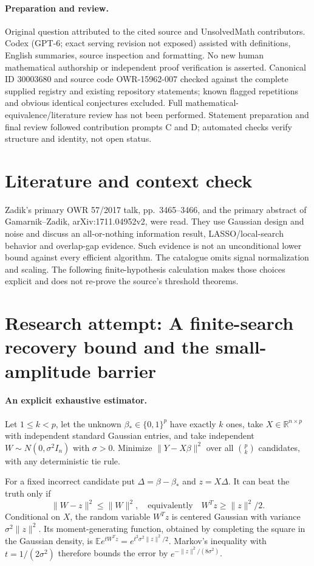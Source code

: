 \documentclass[11pt]{article}
\begin{document}
\paragraph{Preparation and review.}
Original question attributed to the cited source and UnsolvedMath contributors. Codex (GPT-6; exact serving revision not exposed) assisted with definitions, English summaries, source inspection and formatting. No new human mathematical authorship or independent proof verification is asserted. Canonical ID 30003680 and source code OWR-15962-007 checked against the complete supplied registry and existing repository statements; known flagged repetitions and obvious identical conjectures excluded. Full mathematical-equivalence/literature review has not been performed. Statement preparation and final review followed contribution prompts C and D; automated checks verify structure and identity, not open status.
\label{end:30003680}

\section{Literature and context check}
Zadik's primary OWR 57/2017 talk, pp.~3465--3466, and the primary abstract of Gamarnik--Zadik, arXiv:1711.04952v2, were read. They use Gaussian design and noise and discuss an all-or-nothing information result, LASSO/local-search behavior and overlap-gap evidence. Such evidence is not an unconditional lower bound against every efficient algorithm. The catalogue omits signal normalization and scaling. The following finite-hypothesis calculation makes those choices explicit and does not re-prove the source's threshold theorems.
\section{Research attempt: A finite-search recovery bound and the small-amplitude barrier}

\paragraph{An explicit exhaustive estimator.}
Let $1\le k<p$, let the unknown $\beta_*\in\{0,1\}^p$ have exactly $k$ ones, take $X\in\mathbb R^{n\times p}$ with independent standard Gaussian entries, and take independent $W\sim N(0,\sigma^2I_n)$ with $\sigma>0$. Minimize $\|Y-X\beta\|^2$ over all $\binom pk$ candidates, with any deterministic tie rule.

For a fixed incorrect candidate put $\Delta=\beta-\beta_*$ and $z=X\Delta$. It can beat the truth only if
\[
 \|W-z\|^2\le\|W\|^2,
 \quad\text{equivalently}\quad
 W^Tz\ge\|z\|^2/2.
\]
Conditional on $X$, the random variable $W^Tz$ is centered Gaussian with variance $\sigma^2\|z\|^2$. Its moment-generating function, obtained by completing the square in the Gaussian density, is $\mathbb Ee^{tW^Tz}=e^{t^2\sigma^2\|z\|^2/2}$. Markov's inequality with $t=1/(2\sigma^2)$ therefore bounds the error by $e^{-\|z\|^2/(8\sigma^2)}$.
\end{document}

